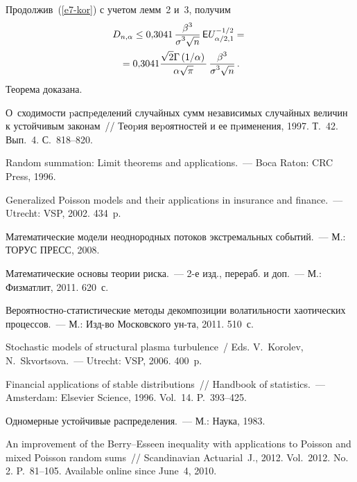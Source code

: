 \begin{multicols}{2}
\smallskip

Продолжив~(\ref{e7-kor}) с учетом лемм~2 и~3, получим
\begin{multline*}
D_{n,\alpha}\le0{,}3041\,\displaystyle\frac{\displaystyle \beta^3\mathstrut}{\displaystyle \sigma^3\sqrt{n}\mathstrut}\,
{\sf E}U_{\alpha/2,1}^{-1/2}={}\\
{}=0{,}3041
\displaystyle\frac{\displaystyle \sqrt{2}\Gamma\left({1}/{\alpha}\right)\mathstrut}{\displaystyle \alpha\sqrt{\pi}\mathstrut}\,
\displaystyle\frac{\displaystyle \beta^3\mathstrut}{\displaystyle \sigma^3\sqrt{n}\mathstrut}\,.
\end{multline*}
Теорема доказана.

\vspace*{-6pt}

{\small\frenchspacing
{%
\begin{thebibliography}{99}

 О~сходимости pаспpеделений случайных сумм независимых
случайных величин к устойчивым законам~// Теоpия веpоятностей и ее
пpименения, 1997. Т.~42. Вып.~4. С.~818--820.

 Random summation:
Limit theorems and applications.~--- Boca Raton: CRC Press, 1996.

 Generalized Poisson models and their applications in
insurance and finance.~--- Utrecht: VSP, 2002. 434~p.

 Математические модели
неоднородных потоков экстремальных событий.~--- М.: ТОРУС ПРЕСС,
2008.

Математические основы теории риска.~--- 2-е изд., перераб. и доп.~--- М.:
Физматлит, 2011. 620~с.

 Вероят\-но\-ст\-но-ста\-ти\-сти\-че\-ские методы
декомпозиции волатильности хаотических процессов.~--- М.: Изд-во
Московского ун-та, 2011. 510~с.

Stochastic models of structural plasma turbulence~/
Eds. V.~Korolev, N.~Skvortsova.~--- Utrecht: VSP, 2006. 400~p.

 Financial applications of stable
distributions~// Handbook of statistics.~--- Amsterdam:
Elsevier Science, 1996.  Vol.~14. P.~393--425.

 Одномерные устойчивые
распределения.~--- М.: Наука, 1983.

\label{end\stat}

 An improvement of the Berry--Esseen
inequality with applications to Poisson and mixed Poisson random
sums~// Scandinavian Actuarial~J., 2012. Vol.~2012. No.\,2.
P.~81--105. Available online since June~4, 2010.

\end{thebibliography} } }

\end{multicols}